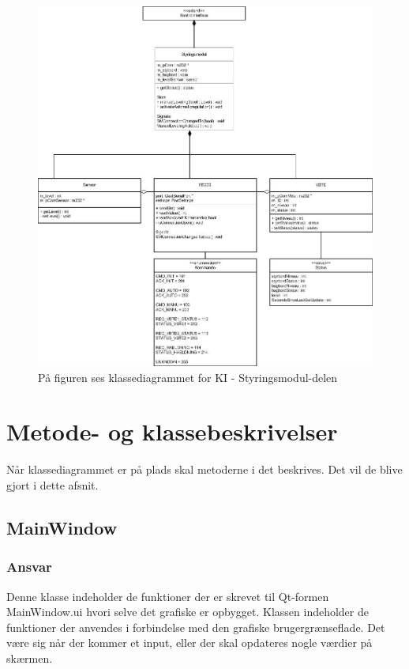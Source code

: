 \begin{figure}[H]
\centering
\includegraphics[width=1\textwidth]{billeder/SM-Class}
\caption{På figuren ses klassediagrammet for KI - Styringsmodul-delen}
\label{fig:kd_sm_del}
\end{figure}

\section{Metode- og klassebeskrivelser}
Når klassediagrammet er på plads skal metoderne i det beskrives. Det vil de blive gjort i dette afsnit.

\subsection{MainWindow}
\subsubsection{Ansvar}
Denne klasse indeholder de funktioner der er skrevet til Qt-formen MainWindow.ui hvori selve det grafiske er opbygget. Klassen indeholder de funktioner der anvendes i forbindelse med den grafiske brugergrænseflade. Det være sig når der kommer et input, eller der skal opdateres nogle værdier på skærmen.
